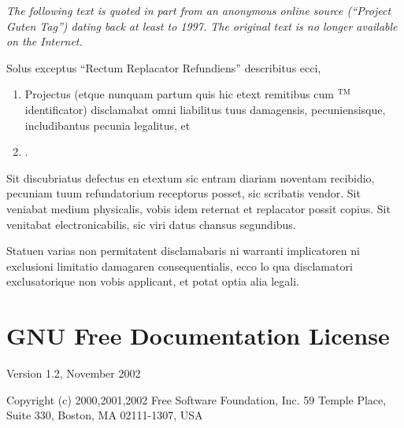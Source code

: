\emph{The following text is quoted in part from an anonymous online
source ($\!$\textsf{``}Project Guten Tag\textsf{''}) dating back at least to 1997.
The original text is no longer available on the Internet.}

\medskip{}


Solus exceptus \textsf{``}Rectum Replacator Refundiens\textsf{''} describitus ecci,
\begin{enumerate}
\item Projectus (etque nunquam partum quis hic etext remitibus cum $^{\text{TM}}$ identificator) disclamabat omni liabilitus
tuus damagensis, pecuniensisque, includibantus pecunia legalitus,
et 
\item {}. 
\end{enumerate}
Sit discubriatus defectus en etextum sic entram diariam noventam recibidio,
pecuniam tuum refundatorium receptorus posset, sic scribatis vendor.
Sit veniabat medium physicalis, vobis idem reternat et replacator
possit copius. Sit venitabat electronicabilis, sic viri datus chansus
segundibus. 


Statuen varias non permitatent disclamabaris ni warranti implicatoren
ni exclusioni limitatio damagaren consequentialis, ecco lo qua disclamatori
exclusato\-rique non vobis applicant, et potat optia alia legali.

\twocolumn

\chapter{GNU Free Documentation License\label{sec:GFDL} }

{\footnotesize{}Version 1.2, November 2002}{\footnotesize\par}

{\tiny{}Copyright (c) 2000,2001,2002 Free Software Foundation, Inc.
59 Temple Place, Suite 330, Boston, MA 02111-1307, USA}{\tiny\par}

